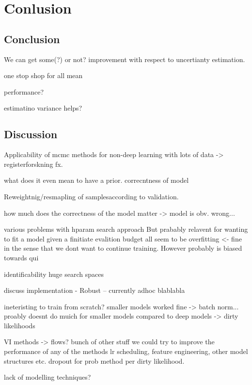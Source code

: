 \documentclass[a4paper,twoside,10.5pt]{report} %
\begin{document}

\pagecolor{white}
\pagestyle{empty}
\cleardoublepage 

\clearpage 
\pagestyle{main}

\clearpage 

\clearpage 

\cleardoublepage 


\tableofcontents
\cleardoublepage 






\chapter{Conlusion}

\section{Conclusion}
We can get some(?) or not? improvement with respect to uncertianty estimation.

one stop shop for all mean

performance?

estimatino variance helps?


\section{Discussion}
Applicability of mcmc methods for non-deep learning with lots of data -> registerforskning fx.

what does it even mean to have a prior. correcntness of model

Reweightnig/resmapling of samplesaccording to validation.

how much does the correctness of the model matter -> model is obv. wrong...

various problems with hparam search approach
But prabably relavent for wanting to fit a model given a finitiate evalition budget
all seem to be overfitting <- fine in the sense that we dont want to continue training. However probably is biased towards qui

identificability huge search spaces

discuss implementation
 - Robust -- currently adhoc blablabla


ineteristing to train from scratch? smaller models worked fine -> batch norm... proably doesnt do muich for smaller models compared to deep models
-> dirty likelihoods


VI methods -> flows?
bunch of other stuff we could try to improve the performance of any of the methods lr scheduling, feature engineering, other model structures etc. 
dropout for prob method per dirty likelihood.

lack of modelling techniques?


\nocite{*}
\printbibliography[heading=bibintoc,title={Bibliography}]
\cleardoublepage 
\appendix

\cleartoleftpage

\end{document}
